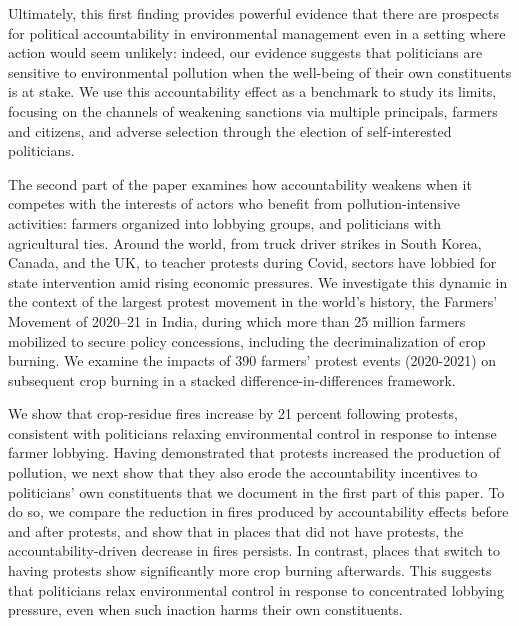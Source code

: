 \documentclass[12pt]{article}
\begin{document}
Ultimately, this first finding provides powerful evidence that there are prospects for political accountability in environmental management even in a setting where action would seem unlikely: indeed, our evidence suggests that politicians are sensitive to environmental pollution when the well-being of their own constituents is at stake. We use this accountability effect as a benchmark to study its limits, focusing on the channels of weakening sanctions via multiple principals, farmers and citizens, and adverse selection through the election of self-interested politicians. 


The second part of the paper examines how accountability weakens when it competes with the interests of actors who benefit from pollution-intensive activities: farmers organized into lobbying groups, and politicians with agricultural ties. %
Around the world, from truck driver strikes in South Korea, Canada, and the UK, to teacher protests during Covid, sectors have lobbied for state intervention amid rising economic pressures. We investigate this dynamic in the context of the largest protest movement in the world's history, the Farmers’ Movement of 2020–21 in India, during which more than 25 million farmers mobilized to secure policy concessions, including the decriminalization of crop burning. We examine the impacts of 390 farmers' protest events (2020-2021) on subsequent crop burning in a stacked difference-in-differences framework.



We show that crop‐residue fires increase by 21 percent following protests, consistent with politicians relaxing environmental control in response to intense farmer lobbying. Having demonstrated that protests increased the production of pollution, we next show that they also erode the accountability incentives to politicians' own constituents that we document in the first part of this paper. To do so, we compare the reduction in fires produced by accountability effects before and after protests, and show that in places that did not have protests, the accountability-driven decrease in fires persists. In contrast, places that switch to having protests show significantly more crop burning afterwards. This suggests that politicians relax environmental control in response to concentrated lobbying pressure, even when such inaction harms their own constituents.
\end{document}
